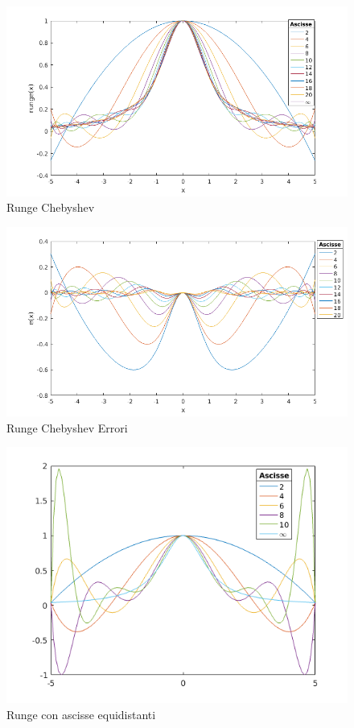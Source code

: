 \begin{figure}[h]
\caption{Runge Chebyshev}
\label{RungeChe}
\includegraphics[width=\textwidth]{plot/Runge_cheb}
\end{figure}
\begin{figure}[h]
\caption{Runge Chebyshev Errori}
\label{RungeCheErr}
\includegraphics[width=\textwidth]{plot/Runge_cheb_err}
\end{figure}
\begin{figure}[h]
\caption{Runge con ascisse equidistanti}
\label{RungeEq}
\includegraphics[width=\textwidth]{plot/Runge_equi}
\end{figure}
